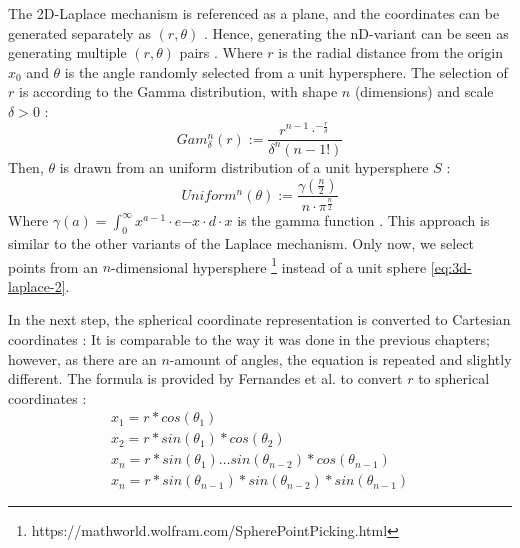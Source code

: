 The 2D-Laplace mechanism is referenced as a plane, and the coordinates can be generated separately as $(r, \theta)$ \citep{fernandes_generalised_2019,DBLP:journals/corr/abs-1212-1984}.
Hence, generating the nD-variant can be seen as generating multiple $(r, \theta)$ pairs \citep{fernandes_generalised_2019}.
Where $r$ is the radial distance from the origin $x_0$ and $\theta$ is the angle randomly selected from a unit hypersphere.
The selection of $r$ is according to the Gamma distribution, with shape $n$ (dimensions) and scale $\delta > 0$ \citep{fernandes_generalised_2019}:
\begin{equation}
  Gam^n_\delta(r) := \frac{r^{n-1}\cdot^{-\frac{r}{\delta}}}{\delta^n(n-1!)}
  \label{eq:generate_r_for_nd_laplace}
\end{equation}
Then, $\theta$ is drawn from an uniform distribution of a unit hypersphere $S$ \citep{fernandes_generalised_2019}:
\begin{equation}
  Uniform^n(\theta) := \frac{\gamma(\frac{n}{2})}{n \cdot \pi ^{\frac{n}{2}}}
  \label{eq:generate_theta_for_nd_laplace}
\end{equation}
Where $\gamma(a) = \int^\infty_0 x^{a-1} \cdot e{-x} \cdot d \cdot x$ is the gamma function \citep{fernandes_generalised_2019}.
This approach is similar to the other variants of the Laplace mechanism.
Only now, we select points from an $n$-dimensional hypersphere  \footnote{https://mathworld.wolfram.com/SpherePointPicking.html} instead of a unit sphere \ref{eq:3d-laplace-2}. \newline

In the next step, the spherical coordinate representation is converted to Cartesian coordinates \citep{fernandes_generalised_2019}:
It is comparable to the way it was done in the previous chapters; however, as there are an $n$-amount of angles, the equation is repeated and slightly different.
The formula is provided by Fernandes et al. to convert $r$ to spherical coordinates \citep{fernandes_generalised_2019}:
\begin{align}
  x_1 = r * cos (\theta_1)                                          \\
  x_2 = r * sin (\theta_1) * cos (\theta_2)                         \\
  x_{n} = r * sin(\theta_1) … sin(\theta_{n-2}) *cos (\theta_{n-1}) \\
  x_n = r * sin(\theta_{n-1}) * sin(\theta_{n-2}) * sin(\theta_{n-1})
  \label{eq:nd-laplace-cartesian}
\end{align}

